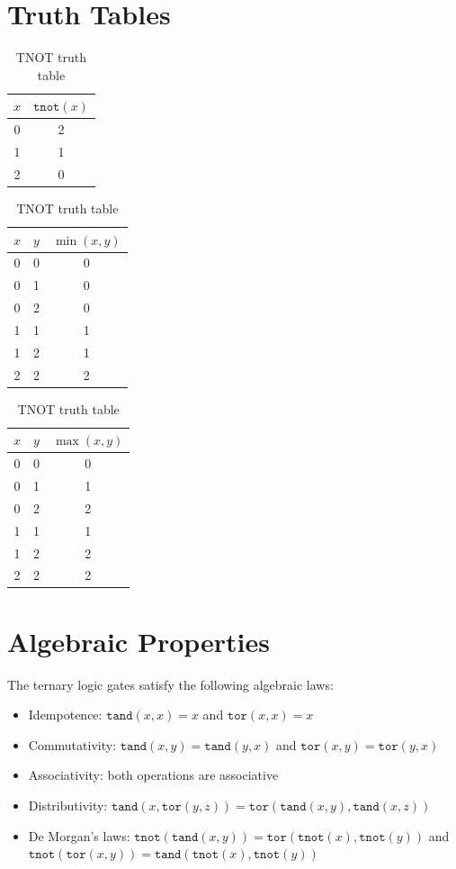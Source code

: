 \documentclass[10pt,a4paper,twoside]{book}
\begin{document}
\section{Truth Tables}

\begin{table}[H]
\centering
\caption{TNOT truth table}
\label{tab:tnot}
\begin{tabular}{c|c}
$x$ & $\texttt{tnot}(x)$ \\ \midrule
0 & 2 \\
1 & 1 \\
2 & 0
\end{tabular}
\qquad
\begin{tabular}{cc|c}
$x$ & $y$ & $\min(x,y)$ \\ \midrule
0 & 0 & 0 \\
0 & 1 & 0 \\
0 & 2 & 0 \\
1 & 1 & 1 \\
1 & 2 & 1 \\
2 & 2 & 2
\end{tabular}
\qquad
\begin{tabular}{cc|c}
$x$ & $y$ & $\max(x,y)$ \\ \midrule
0 & 0 & 0 \\
0 & 1 & 1 \\
0 & 2 & 2 \\
1 & 1 & 1 \\
1 & 2 & 2 \\
2 & 2 & 2
\end{tabular}
\end{table}

\section{Algebraic Properties}

The ternary logic gates satisfy the following algebraic laws:
\begin{itemize}
    \item Idempotence: $\texttt{tand}(x, x) = x$ and $\texttt{tor}(x, x) = x$
    \item Commutativity: $\texttt{tand}(x, y) = \texttt{tand}(y, x)$ and
          $\texttt{tor}(x, y) = \texttt{tor}(y, x)$
    \item Associativity: both operations are associative
    \item Distributivity: $\texttt{tand}(x, \texttt{tor}(y, z)) =
          \texttt{tor}(\texttt{tand}(x, y), \texttt{tand}(x, z))$
    \item De Morgan's laws: $\texttt{tnot}(\texttt{tand}(x, y)) =
          \texttt{tor}(\texttt{tnot}(x), \texttt{tnot}(y))$ and
          $\texttt{tnot}(\texttt{tor}(x, y)) =
          \texttt{tand}(\texttt{tnot}(x), \texttt{tnot}(y))$
\end{itemize}
\end{document}
